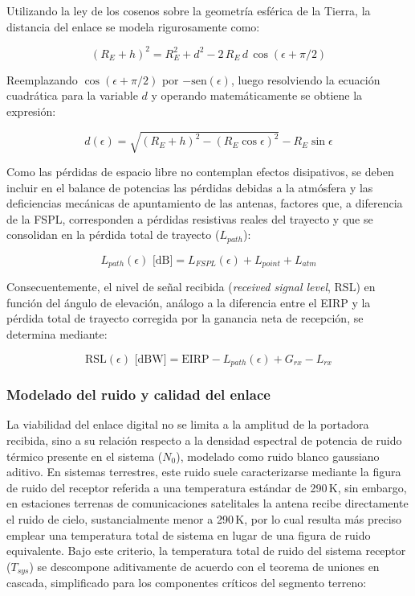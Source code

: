 Utilizando la ley de los cosenos sobre la geometría esférica de la Tierra, la distancia del enlace se modela rigurosamente como:

\begin{equation}
   (R_E+h)^2 = R_E^2 + d^2 - 2\,R_E\,d\,\cos(\epsilon + \pi/2)
    \label{eq:ley_cos}
\end{equation}

Reemplazando $\cos(\epsilon+\pi/2)$ por $-\text{sen}(\epsilon)$, luego resolviendo la ecuación cuadrática para la variable $d$ y operando matemáticamente se obtiene la expresión:

\begin{equation}
    d(\epsilon) = \sqrt{(R_E + h)^2 - (R_E \cos\epsilon)^2} - R_E \sin\epsilon
    \label{eq:geometria_orbita}
\end{equation}

Como las pérdidas de espacio libre no contemplan efectos disipativos, se deben incluir en el balance de potencias las pérdidas debidas a la atmósfera y las deficiencias mecánicas de apuntamiento de las antenas, factores que, a diferencia de la FSPL, corresponden a pérdidas resistivas reales del trayecto y que se consolidan en la pérdida total de trayecto ($L_{path}$):

\begin{equation}
    L_{path}(\epsilon) \text{ [dB]} = L_{FSPL}(\epsilon) + L_{point} + L_{atm}
    \label{eq:perdidas_totales}
\end{equation}

Consecuentemente, el nivel de señal recibida (\textit{received signal level}, RSL) en función del ángulo de elevación, análogo a la diferencia entre el EIRP y la pérdida total de trayecto corregida por la ganancia neta de recepción, se determina mediante:

\begin{equation}
    \text{RSL}(\epsilon) \text{ [dBW]} = \text{EIRP} - L_{path}(\epsilon) + G_{rx} - L_{rx}
    \label{eq:rsl_formal}
\end{equation}

\subsubsection{Modelado del ruido y calidad del enlace}
La viabilidad del enlace digital no se limita a la amplitud de la portadora recibida, sino a su relación respecto a la densidad espectral de potencia de ruido térmico presente en el sistema ($N_0$), modelado como ruido blanco gaussiano aditivo. En sistemas terrestres, este ruido suele caracterizarse mediante la figura de ruido del receptor referida a una temperatura estándar de 290\,K, sin embargo, en estaciones terrenas de comunicaciones satelitales la antena recibe directamente el ruido de cielo, sustancialmente menor a 290\,K, por lo cual resulta más preciso emplear una temperatura total de sistema en lugar de una figura de ruido equivalente. Bajo este criterio, la temperatura total de ruido del sistema receptor ($T_{sys}$) se descompone aditivamente de acuerdo con el teorema de uniones en cascada, simplificado para los componentes críticos del segmento terreno:

